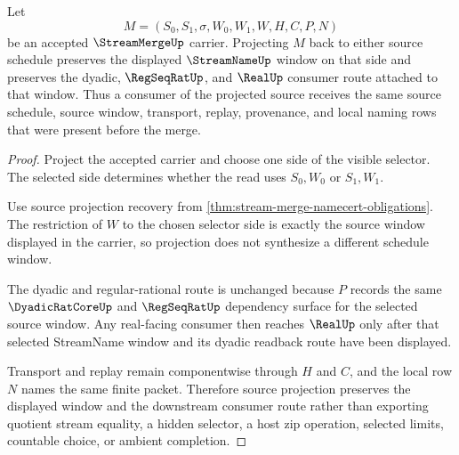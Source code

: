 \begin{theorem}
\label{thm:stream-merge-projection-stability}
Let
$$
M=(S_0,S_1,\sigma,W_0,W_1,W,H,C,P,N)
$$
be an accepted $\StreamMergeUp$ carrier. Projecting $M$ back to either source schedule preserves the displayed $\StreamNameUp$ window on that side and preserves the dyadic, $\RegSeqRatUp$, and $\RealUp$ consumer route attached to that window. Thus a consumer of the projected source receives the same source schedule, source window, transport, replay, provenance, and local naming rows that were present before the merge.
\end{theorem}
\begin{proof}
Project the accepted carrier and choose one side of the visible selector. The selected side determines whether the read uses $S_0,W_0$ or $S_1,W_1$.

Use source projection recovery from \autoref{thm:stream-merge-namecert-obligations}. The restriction of $W$ to the chosen selector side is exactly the source window displayed in the carrier, so projection does not synthesize a different schedule window.

The dyadic and regular-rational route is unchanged because $P$ records the same $\DyadicRatCoreUp$ and $\RegSeqRatUp$ dependency surface for the selected source window. Any real-facing consumer then reaches $\RealUp$ only after that selected StreamName window and its dyadic readback route have been displayed.

Transport and replay remain componentwise through $H$ and $C$, and the local row $N$ names the same finite packet. Therefore source projection preserves the displayed window and the downstream consumer route rather than exporting quotient stream equality, a hidden selector, a host zip operation, selected limits, countable choice, or ambient completion.
\end{proof}



